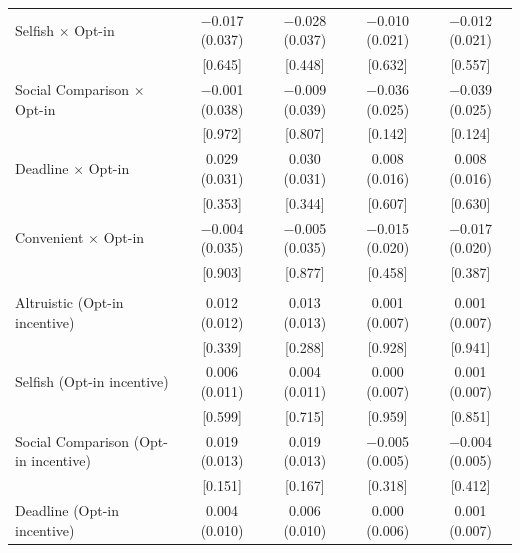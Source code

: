 \documentclass[
    a4paper
]{article}
\begin{document}
\begin{table}
\begin{threeparttable}
\begin{tabular}[t]{lcccc}
Selfish $\times$ Opt-in & \num{-0.017} (\num{0.037}) & \num{-0.028} (\num{0.037}) & \num{-0.010} (\num{0.021}) & \num{-0.012} (\num{0.021})\\
 & {}[\num{0.645}] & {}[\num{0.448}] & {}[\num{0.632}] & {}[\num{0.557}]\\
Social Comparison $\times$ Opt-in & \num{-0.001} (\num{0.038}) & \num{-0.009} (\num{0.039}) & \num{-0.036} (\num{0.025}) & \num{-0.039} (\num{0.025})\\
 & {}[\num{0.972}] & {}[\num{0.807}] & {}[\num{0.142}] & {}[\num{0.124}]\\
Deadline $\times$ Opt-in & \num{0.029} (\num{0.031}) & \num{0.030} (\num{0.031}) & \num{0.008} (\num{0.016}) & \num{0.008} (\num{0.016})\\
 & {}[\num{0.353}] & {}[\num{0.344}] & {}[\num{0.607}] & {}[\num{0.630}]\\
Convenient $\times$ Opt-in & \num{-0.004} (\num{0.035}) & \num{-0.005} (\num{0.035}) & \num{-0.015} (\num{0.020}) & \num{-0.017} (\num{0.020})\\
 & {}[\num{0.903}] & {}[\num{0.877}] & {}[\num{0.458}] & {}[\num{0.387}]\\
\addlinespace[0.3em]
\multicolumn{5}{l}{\textbf{Linear combination test: Treatment + Opt-in $\times$ Treatment}}\\
\hspace{1em}Altruistic (Opt-in incentive) & \num{0.012} (\num{0.012}) & \num{0.013} (\num{0.013}) & \num{0.001} (\num{0.007}) & \num{0.001} (\num{0.007})\\
\hspace{1em} & {}[\num{0.339}] & {}[\num{0.288}] & {}[\num{0.928}] & {}[\num{0.941}]\\
\hspace{1em}Selfish (Opt-in incentive) & \num{0.006} (\num{0.011}) & \num{0.004} (\num{0.011}) & \num{0.000} (\num{0.007}) & \num{0.001} (\num{0.007})\\
\hspace{1em} & {}[\num{0.599}] & {}[\num{0.715}] & {}[\num{0.959}] & {}[\num{0.851}]\\
\hspace{1em}Social Comparison (Opt-in incentive) & \num{0.019} (\num{0.013}) & \num{0.019} (\num{0.013}) & \num{-0.005} (\num{0.005}) & \num{-0.004} (\num{0.005})\\
\hspace{1em} & {}[\num{0.151}] & {}[\num{0.167}] & {}[\num{0.318}] & {}[\num{0.412}]\\
\hspace{1em}Deadline (Opt-in incentive) & \num{0.004} (\num{0.010}) & \num{0.006} (\num{0.010}) & \num{0.000} (\num{0.006}) & \num{0.001} (\num{0.007})\\

\end{tabular}
\end{threeparttable}
\end{table}
\end{document}
